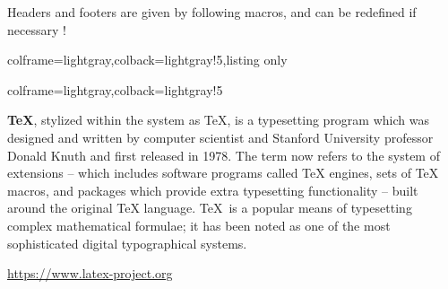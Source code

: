 \documentclass[11pt,a4paper]{ltxdoc}
\begin{document}
Headers and footers are given by following macros, and can be redefined if necessary !

\begin{tcblisting}{colframe=lightgray,colback=lightgray!5,listing only}
\newcommand\mastodonheader{%
	\begin{tblr}{width=\linewidth,colspec={Q[c,m]X[m,l]Q[m,l]},
		colsep=0pt,cells={font=\scriptsize\sffamily}}
		$\vcenter{\hbox{\texttt{[image: \\mastodonaccountavatar]}}}$& {\hspace*{1.25ex}\mastodonaccountname \\ \hspace*{1.25ex}\color{darkgray}{\mastodonaccountadress}} & \color{darkgray}{\faGlobeAmericas~\mastodontime} \\
	\end{tblr}\par\medskip
}

\newcommand\blueskyheader{%
	{\scriptsize\sffamily\textbf{\mastodonaccountname}~
	\textcolor{darkgray}{\mastodonaccountadress~
	\textperiodcentered~\mastodontime}}\par\medskip
}

\newcommand\mastodonfooter{%
	\textcolor{darkgray}{\scriptsize\scalebox{-1}[1]{\faShare}~\mastodonnumbers[1] \hfill \faRetweet~\mastodonnumbers[2] \hfill \faStar[regular]~\mastodonnumbers[3] \hfill \faBookmark[regular] \hfill \faEllipsisH}
}

\newcommand\blueskyfooter{%
	\textcolor{darkgray}{\scriptsize\faComment*[regular]~\mastodonnumbers[1] \hfill \faRetweet~\mastodonnumbers[2] \hfill \faHeart[regular]~\mastodonnumbers[3] \hfill \faEllipsisH \hfill~}
}
\end{tcblisting}

\begin{tcblisting}{colframe=lightgray,colback=lightgray!5}
\begin{MastodonPost}
\textbf{TeX}, stylized within the system as \TeX, is a typesetting program which was designed and written by computer scientist and Stanford University professor Donald Knuth and first released in 1978. The term now refers to the system of extensions – which includes software programs called TeX engines, sets of TeX macros, and packages which provide extra typesetting functionality – built around the original TeX language. \TeX\ is a popular means of typesetting complex mathematical formulae; it has been noted as one of the most sophisticated digital typographical systems.

\medskip

\url{https://www.latex-project.org}
\end{MastodonPost}
\end{tcblisting}
\end{document}
